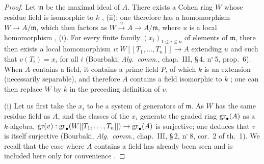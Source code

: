 \begin{proof}
Let $\mathfrak{m}$ be the maximal ideal of $A$.
There exists a Cohen ring $W$ whose residue field is isomorphic to $k$ , (ii); one therefore has a homomorphism $W\to A/\mathfrak{m}$, which then factors as $W\xrightarrow{u}A\to A/\mathfrak{m}$, where $u$ is a local homomorphism , (i).
For every finite family $(x_i)_{1\leq i\leq n}$ of elements of $\mathfrak{m}$, there then exists a local homomorphism $v:W[[T_1,\ldots,T_n]]\to A$ extending $u$ and such that $v(T_i)=x_i$ for all $i$ (Bourbaki, \emph{Alg.\ comm.}, chap.~III, \S\,4, n$^\circ$\,5, prop.~6).
When $A$ contains a field, it contains a prime field $P$, of which $k$ is an extension (necessarily separable), and therefore $A$ contains a field isomorphic to $k$ ; one can then replace $W$ by $k$ in the preceding definition of $v$.

\medskip
\noindent(i)\enspace
Let us first take the $x_i$ to be a system of generators of $\mathfrak{m}$.
As $W$ has the same residue field as $A$, and the classes of the $x_i$ generate the graded ring $\operatorname{gr}_\bullet(A)$ as a $k$-algebra, $\operatorname{gr}(v):\operatorname{gr}_\bullet(W[[T_1,\ldots,T_n]])\to\operatorname{gr}_\bullet(A)$ is surjective; one deduces that $v$ is itself surjective (Bourbaki, \emph{Alg.\ comm.}, chap.~III, \S\,2, n$^\circ$\,8, cor.~2 of th.~1).
We recall that the case where $A$ contains a field has already been seen and is included here only for convenience .


\end{proof}
